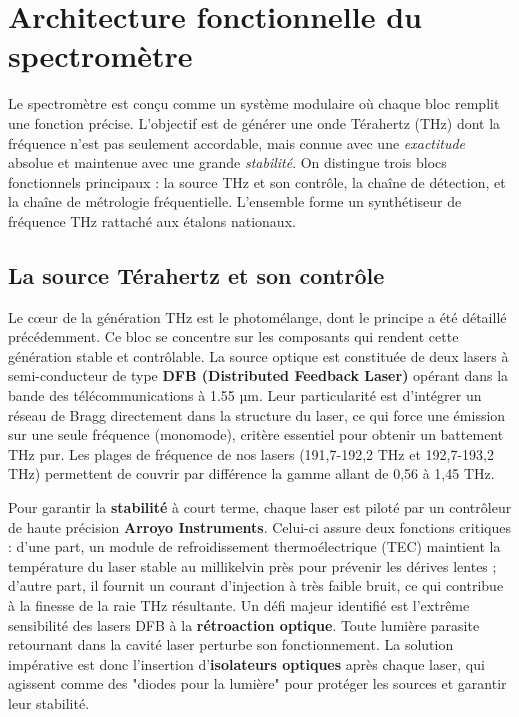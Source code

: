 


\section{Architecture fonctionnelle du spectromètre}
\label{sec:architecture}

Le spectromètre est conçu comme un système modulaire où chaque bloc remplit une fonction précise. L'objectif est de générer une onde Térahertz (THz) dont la fréquence n'est pas seulement accordable, mais connue avec une \textit{exactitude} absolue et maintenue avec une grande \textit{stabilité}. On distingue trois blocs fonctionnels principaux : la source THz et son contrôle, la chaîne de détection, et la chaîne de métrologie fréquentielle. L'ensemble forme un synthétiseur de fréquence THz rattaché aux étalons nationaux.

\subsection{La source Térahertz et son contrôle}
Le cœur de la génération THz est le photomélange, dont le principe a été détaillé précédemment. Ce bloc se concentre sur les composants qui rendent cette génération stable et contrôlable. La source optique est constituée de deux lasers à semi-conducteur de type \textbf{DFB (Distributed Feedback Laser)} opérant dans la bande des télécommunications à 1.55 µm. Leur particularité est d'intégrer un réseau de Bragg directement dans la structure du laser, ce qui force une émission sur une seule fréquence (monomode), critère essentiel pour obtenir un battement THz pur. Les plages de fréquence de nos lasers (191,7-192,2 THz et 192,7-193,2 THz) permettent de couvrir par différence la gamme allant de 0,56 à 1,45 THz.

Pour garantir la \textbf{stabilité} à court terme, chaque laser est piloté par un contrôleur de haute précision \textbf{Arroyo Instruments}. Celui-ci assure deux fonctions critiques : d'une part, un module de refroidissement thermoélectrique (TEC) maintient la température du laser stable au millikelvin près pour prévenir les dérives lentes ; d'autre part, il fournit un courant d'injection à très faible bruit, ce qui contribue à la finesse de la raie THz résultante. Un défi majeur identifié est l'extrême sensibilité des lasers DFB à la \textbf{rétroaction optique}. Toute lumière parasite retournant dans la cavité laser perturbe son fonctionnement. La solution impérative est donc l'insertion d'\textbf{isolateurs optiques} après chaque laser, qui agissent comme des "diodes pour la lumière" pour protéger les sources et garantir leur stabilité.

